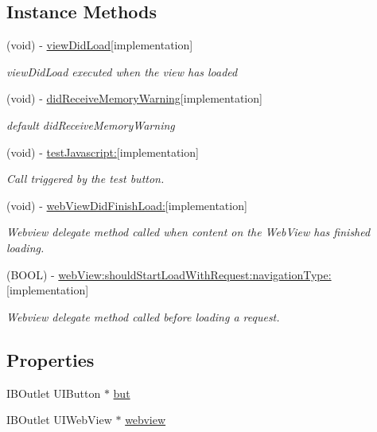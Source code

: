 \subsection*{Instance Methods}
\begin{DoxyCompactItemize}
\item 
(void) -\/ \hyperlink{interface_view_controller_aa8418c79310bb5f7235485aae32296e7}{view\-Did\-Load}{\ttfamily  \mbox{[}implementation\mbox{]}}
\begin{DoxyCompactList}\small\item\em view\-Did\-Load executed when the view has loaded \end{DoxyCompactList}\item 
(void) -\/ \hyperlink{interface_view_controller_a594064ed32a3f907d3055adb615b8662}{did\-Receive\-Memory\-Warning}{\ttfamily  \mbox{[}implementation\mbox{]}}
\begin{DoxyCompactList}\small\item\em default did\-Receive\-Memory\-Warning \end{DoxyCompactList}\item 
(void) -\/ \hyperlink{interface_view_controller_a6bf5e01d692477bccb7fd038adf226cb}{test\-Javascript\-:}{\ttfamily  \mbox{[}implementation\mbox{]}}
\begin{DoxyCompactList}\small\item\em Call triggered by the test button. \end{DoxyCompactList}\item 
(void) -\/ \hyperlink{interface_view_controller_a2de1bcd263bb715f7a8edc6c2a658a9e}{web\-View\-Did\-Finish\-Load\-:}{\ttfamily  \mbox{[}implementation\mbox{]}}
\begin{DoxyCompactList}\small\item\em Webview delegate method called when content on the Web\-View has finished loading. \end{DoxyCompactList}\item 
(B\-O\-O\-L) -\/ \hyperlink{interface_view_controller_a4176871569ddf10cd79a9fc6e5e340bb}{web\-View\-:should\-Start\-Load\-With\-Request\-:navigation\-Type\-:}{\ttfamily  \mbox{[}implementation\mbox{]}}
\begin{DoxyCompactList}\small\item\em Webview delegate method called before loading a request. \end{DoxyCompactList}\end{DoxyCompactItemize}
\subsection*{Properties}
\begin{DoxyCompactItemize}
\item 
I\-B\-Outlet U\-I\-Button $\ast$ \hyperlink{interface_view_controller_ad839c30ee296cfa982923261103473e8}{but}
\item 
I\-B\-Outlet U\-I\-Web\-View $\ast$ \hyperlink{interface_view_controller_ab7e91cb8cf4ad3747ee6a634897a9f2f}{webview}
\end{DoxyCompactItemize}


